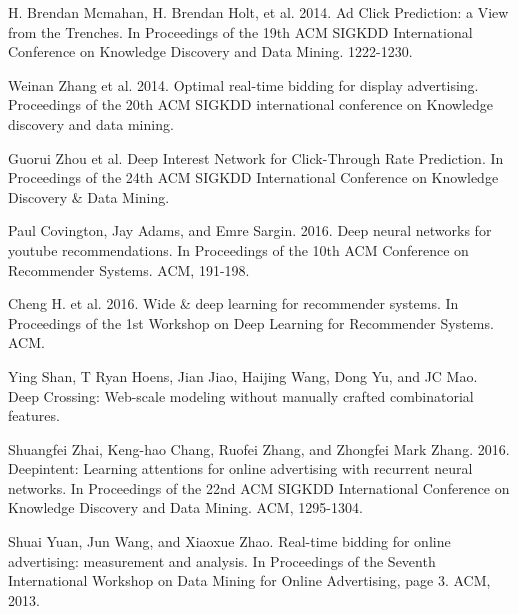 \documentclass{sig-alternate-05-2015}
\begin{document}
%




%
%
\begin{thebibliography}{9}

H. Brendan Mcmahan, H. Brendan Holt, et al. 2014. 
Ad Click Prediction: a View from the Trenches. 
In Proceedings of the 19th ACM SIGKDD International Conference on Knowledge Discovery and Data Mining. 1222-1230.

Weinan Zhang et al. 2014.
Optimal real-time bidding for display advertising.
Proceedings of the 20th ACM SIGKDD international conference on Knowledge discovery and data mining.

Guorui Zhou et al. 
Deep Interest Network for Click-Through Rate Prediction.
In Proceedings of the 24th ACM SIGKDD International Conference on Knowledge Discovery \& Data Mining.

Paul Covington, Jay Adams, and Emre Sargin. 2016. 
Deep neural networks for youtube recommendations. 
In Proceedings of the 10th ACM Conference on Recommender Systems. ACM, 191-198.

Cheng H. et al. 2016. Wide \& deep learning for recommender systems. 
In Proceedings of the 1st Workshop on Deep Learning for Recommender Systems. ACM.

Ying Shan, T Ryan Hoens, Jian Jiao, Haijing Wang, Dong Yu, and JC Mao. Deep
Crossing: Web-scale modeling without manually crafted combinatorial features.

Shuangfei Zhai, Keng-hao Chang, Ruofei Zhang, and Zhongfei Mark Zhang. 2016.
Deepintent: Learning attentions for online advertising with recurrent neural networks. 
In Proceedings of the 22nd ACM SIGKDD International Conference on Knowledge Discovery and Data Mining. ACM, 1295-1304.

Shuai Yuan, Jun Wang, and Xiaoxue Zhao. Real-time bidding for online advertising: measurement and analysis. 
In Proceedings of the Seventh International Workshop on Data Mining for Online Advertising, page 3. ACM, 2013.


\end{thebibliography}
\end{document}
